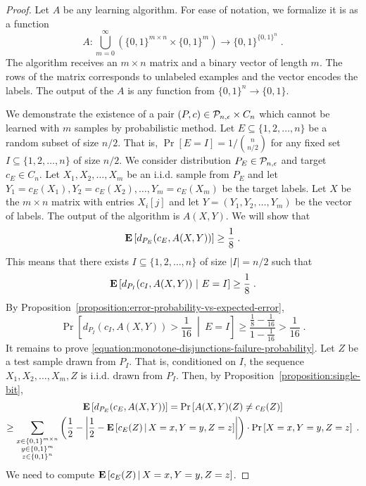 \begin{proof}
Let $A$ be any learning algorithm. For ease of notation, we formalize it is as a function
$$
A:\bigcup_{m=0}^\infty \left(\{0,1\}^{m \times n} \times \{0,1\}^m\right) \to \{0,1\}^{\{0,1\}^n} \; .
$$
The algorithm receives an $m \times n$ matrix and a binary vector of length $m$.
The rows of the matrix corresponds to unlabeled examples and the vector encodes
the labels. The output of the $A$ is any function from $\{0,1\}^n \to \{0,1\}$.

We demonstrate the existence of a pair $(P,c) \in \P_{n,\epsilon} \times C_n$
which cannot be learned with $m$ samples by probabilistic method. Let $E
\subseteq \{1,2,\dots,n\}$ be a random subset of size $n/2$. That is, $\Pr[E =
I] = 1/\binom{n}{n/2}$ for any fixed set $I \subseteq \{1,2,\dots,n\}$ of
size $n/2$. We consider distribution $P_E \in \P_{n,\epsilon}$ and target $c_E
\in C_n$. Let $X_1, X_2, \dots, X_m$ be an i.i.d. sample from $P_E$ and let $Y_1 =
c_E(X_1), Y_2 = c_E(X_2), \dots, Y_m = c_E(X_m)$ be the target labels. Let $X$
be the $m \times n$ matrix with entries $X_i[j]$ and let $Y = (Y_1, Y_2, \dots,
Y_m)$ be the vector of labels. The output of the algorithm is $A(X,Y)$. We will
show that
\begin{equation}
\label{equation:monotone-disjunctions-failure-probability}
\Exp \left[d_{P_E}(c_E, A(X,Y)) \right] \ge \frac{1}{8} \; .
\end{equation}
This means that there exists $I \subseteq \{1,2,\dots,n\}$ of size $|I|=n/2$ such that
$$
\Exp \left[d_{P_I}(c_I, A(X,Y)) ~\middle|~ E = I \right] \ge \frac{1}{8} \; .
$$
By Proposition~\ref{proposition:error-probability-vs-expected-error},
$$
\Pr \left[ d_{P_I}(c_I, A(X,Y)) > \frac{1}{16} ~\middle|~ E = I \right] \ge \frac{\frac{1}{8} - \frac{1}{16}}{1 - \frac{1}{16}} > \frac{1}{16} \; .
$$
It remains to prove \eqref{equation:monotone-disjunctions-failure-probability}.
Let $Z$ be a test sample drawn from $P_I$. That is, conditioned on $I$, the sequence $X_1, X_2, \dots, X_m, Z$ is i.i.d. drawn from $P_I$.
Then, by Proposition~\ref{proposition:single-bit},
\begin{multline}
\label{equation:monotone-disjuctions-xpected-error-lower-bound}
\Exp \left[d_{P_E}(c_E, A(X,Y))\right]
= \Pr\left[ A(X,Y)(Z) \neq c_E(Z) \right] \\
\ge \sum_{\substack{x \in \{0,1\}^{m \times n} \\ y \in \{0,1\}^m \\ z \in \{0,1\}^n}} \left( \frac{1}{2} - \left| \frac{1}{2} - \Exp\left[ c_E(Z) \, \middle| \, X = x, Y = y, Z = z \right] \right| \right) \cdot \Pr \left[X = x, Y = y, Z = z \right]  \; .
\end{multline}
We need to compute $\Exp\left[ c_E(Z) \, \middle| \, X = x, Y = y, Z = z \right]$.
\end{proof}


